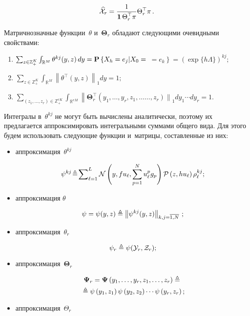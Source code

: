 \begin{multicols}{2}
\noindent
\begin{equation*}
\widehat{\mathcal{X}}_r =  \displaystyle\frac{\displaystyle 1\mathstrut}{\displaystyle \mathbf{1}\,\Theta_r^{\top} \pi\mathstrut}\Theta_r^{\top} \pi\,.
\end{equation*}

\vspace*{-3pt}

\noindent
Матричнозначные функции~$\theta$ и~$\mathbf{\Theta}_r$ обладают сле\-ду\-ющи\-ми 
очевидными свойствами:
\begin{enumerate}[(1)]
\item
$ %
\sum\nolimits_{z \in \mathbb{Z}_+^K} \int_{\mathbb{R}^M} \theta^{kj}(y,z)\, dy\hm = \mathbf{P}\left\{X_h = e_j \vert  X_0=\right.$\linebreak
$\left.{}= e_k\right\} = \left(\exp\{h\Lambda\}\right)^{kj};
$
\item
$ %
\sum\nolimits_{z \in \mathbb{Z}_+^K} \int\nolimits_{\mathbb{R}^M}\left \|\theta^{\top}(y,z)\right\|_1 dy = 1;
$
\item
$ \sum\nolimits_{(z_1,\ldots, z_r) \in \mathbb{Z}_+^{rK}} \int\nolimits_{\mathbb{R}^{rM}}
\left\|\mathbf{\Theta}_r^{\top}\left(y_1,\ldots, y_r,z_1,\ldots\right.\right.$\linebreak $\left.\left.\ldots , z_r\right)\right\|_1 dy_1\cdots dy_r = 1.
$
\end{enumerate}
Интегралы в~$\theta^{kj}$ не могут быть вы\-чис\-ле\-ны аналитически, поэтому их 
предлагается аппроксимировать интегральными суммами общего вида. Для этого будем 
использовать сле\-ду\-ющие функции и~мат\-ри\-цы, со\-став\-лен\-ные из них:
\begin{itemize}
\item аппроксимация~$\theta^{kj}$

\noindent
$$
\psi^{kj} \!\triangleq\! \sum\nolimits_{\ell=1}^L
\mathcal{N}\left(y,fu_{\ell},\sum\limits_{p=1}^N u_{\ell}^p g_p\right)
\mathcal{P}\left(z,hu_{\ell}\right)\rho_{\ell}^{k j};
$$
\item аппроксимация $\theta$

\noindent
$$
\psi =\psi(y,z) \triangleq \left\|\psi^{kj}(y,z)\right\|_{k,j=\overline{1,N}}\,;
$$
\item аппроксимация~$\theta_r$

\noindent
$$
\psi_r \triangleq \psi(\mathcal{Y}_r,\mathcal{Z}_r);
$$ 
\item  аппроксимация~$\mathbf{\Theta}_r$ 
\vspace*{-5pt}

\noindent
\begin{multline*}
\mathbf{\Psi}_r = \mathbf{\Psi}\left(y_1,\ldots,y_r, z_1,\ldots,z_r\right) \triangleq{}\\
{}\triangleq
\psi\left(y_1,z_1\right)\psi\left(y_2,z_2\right)\cdots \psi\left(y_r,z_r\right);
\end{multline*}
\item аппроксимация~$\Theta_r$


\end{itemize}
\end{multicols}
